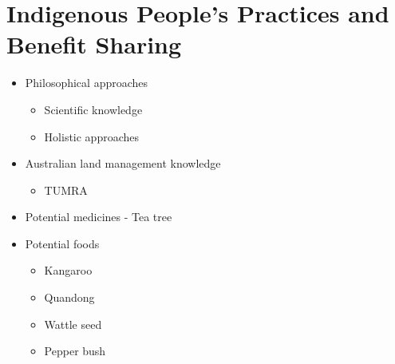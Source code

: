 \section{Indigenous People's Practices and Benefit Sharing} \label{20/11/2024}
	\begin{itemize}
		\item Philosophical approaches
		\begin{itemize}
			\item Scientific knowledge
			\item Holistic approaches
		\end{itemize}
		\item Australian land management knowledge
		\begin{itemize}
			\item TUMRA
		\end{itemize}
		\item Potential medicines - Tea tree
		\item Potential foods
		\begin{itemize}
			\item Kangaroo
			\item Quandong
			\item Wattle seed
			\item Pepper bush
		\end{itemize}
	\end{itemize}